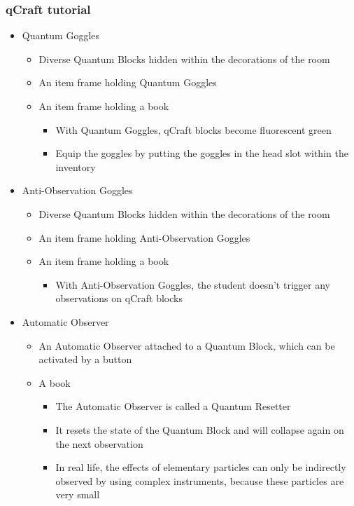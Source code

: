 \documentclass[11pt,twoside]{report} %
\begin{document}
\subsubsection{qCraft tutorial}
	\begin{itemize}
		\item Quantum Goggles
		\begin{itemize}
			\item Diverse Quantum Blocks hidden within the decorations of the room
			\item An item frame holding Quantum Goggles
			\item An item frame holding a book
			\begin{itemize}
				\item With Quantum Goggles, qCraft blocks become fluorescent green
				\item Equip the goggles by putting the goggles in the head slot within the inventory
			\end{itemize}
		\end{itemize}
		\item Anti-Observation Goggles
		\begin{itemize}
			\item Diverse Quantum Blocks hidden within the decorations of the room
			\item An item frame holding Anti-Observation Goggles
			\item An item frame holding a book
			\begin{itemize}
				\item With Anti-Observation Goggles, the student doesn't trigger any observations on qCraft blocks
			\end{itemize}
		\end{itemize}
		\item Automatic Observer
		\begin{itemize}
			\item An Automatic Observer attached to a Quantum Block, which can be activated by a button
			\item A book
			\begin{itemize}
				\item The Automatic Observer is called a Quantum Resetter
				\item It resets the state of the Quantum Block and will collapse again on the next observation
				\item In real life, the effects of elementary particles can only be indirectly observed by using complex instruments, because these particles are very small
			\end{itemize}
		\end{itemize}
	\end{itemize}
\end{document}
